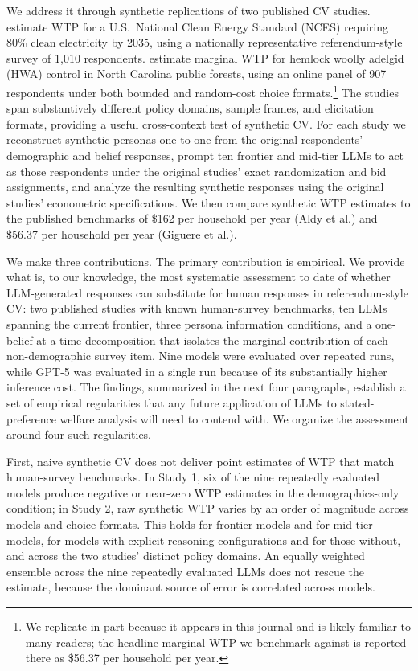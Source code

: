 \documentclass[12pt]{article}
\begin{document}
We address it through synthetic replications of two published CV studies.
\textcite{Aldy2012} estimate WTP for a U.S.\ National Clean Energy Standard
(NCES) requiring 80\% clean electricity by 2035, using a nationally
representative referendum-style survey of 1{,}010 respondents.
\textcite{Giguere2020} estimate marginal WTP for hemlock woolly adelgid
(HWA) control in North Carolina public forests, using an online panel of
907 respondents under both bounded and random-cost choice formats.\footnote{We
replicate \textcite{Giguere2020} in part because it appears in this journal
and is likely familiar to many readers; the headline marginal WTP we
benchmark against is reported there as \$56.37 per household per year.}
The studies span substantively different policy domains, sample frames, and
elicitation formats, providing a useful cross-context test of synthetic CV.
For each study we reconstruct synthetic personas one-to-one from the
original respondents' demographic and belief responses, prompt ten frontier
and mid-tier LLMs to act as those respondents under the original studies'
exact randomization and bid assignments, and analyze the resulting synthetic
responses using the original studies' econometric specifications. We then
compare synthetic WTP estimates to the published benchmarks of \$162 per
household per year (Aldy et al.) and \$56.37 per household per year (Giguere
et al.).

We make three contributions. The primary contribution is empirical. We
provide what is, to our knowledge, the most systematic assessment to date
of whether LLM-generated responses can substitute for human responses in
referendum-style CV: two published studies with known human-survey
benchmarks, ten LLMs spanning the current frontier, three persona
information conditions, and a one-belief-at-a-time decomposition that
isolates the marginal contribution of each non-demographic survey item.
Nine models were evaluated over repeated runs, while GPT-5 was evaluated
in a single run because of its substantially higher inference cost.
The findings, summarized in the next four paragraphs, establish a set of
empirical regularities that any future application of LLMs to
stated-preference welfare analysis will need to contend with. We organize
the assessment around four such regularities.

First, naive synthetic CV does not deliver point estimates of WTP that
match human-survey benchmarks. In Study 1, six of the nine repeatedly
evaluated models produce negative or near-zero WTP estimates in the
demographics-only condition; in Study 2, raw synthetic WTP varies by an
order of magnitude across models and choice formats. This holds for
frontier models and for mid-tier models, for models with explicit reasoning
configurations and for those without, and across the two studies' distinct
policy domains. An equally weighted ensemble across the nine repeatedly
evaluated LLMs does not rescue the estimate, because the dominant source
of error is correlated across models.
\end{document}
